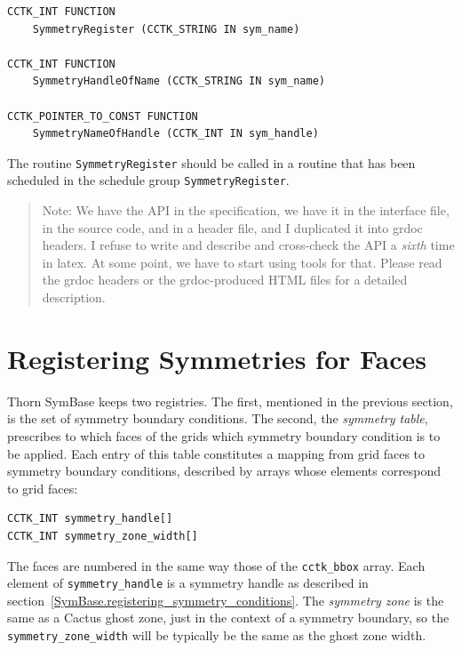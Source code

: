 \begin{verbatim}
CCTK_INT FUNCTION
    SymmetryRegister (CCTK_STRING IN sym_name)

CCTK_INT FUNCTION
    SymmetryHandleOfName (CCTK_STRING IN sym_name)

CCTK_POINTER_TO_CONST FUNCTION
    SymmetryNameOfHandle (CCTK_INT IN sym_handle)
\end{verbatim}

The routine \texttt{SymmetryRegister} should be called in a routine
that has been scheduled in the schedule group
\texttt{SymmetryRegister}.

\begin{quote}
Note: We have the API in the specification, we have it in the
interface file, in the source code, and in a header file, and I
duplicated it into grdoc headers.  I refuse to write and describe and
cross-check the API a \emph{sixth} time in latex.  At some point, we
have to start using tools for that.  Please read the grdoc headers or
the grdoc-produced HTML files for a detailed description.
\end{quote}



\section{Registering Symmetries for Faces}

Thorn SymBase keeps two registries.  The first, mentioned in the
previous section, is the set of symmetry boundary conditions. 
The second, the \emph{symmetry table}, prescribes to which faces
of the grids which symmetry boundary condition is to be applied.
Each entry of this table constitutes a mapping from grid faces to
symmetry boundary conditions, described by arrays whose elements
correspond to grid faces:

\begin{verbatim}
CCTK_INT symmetry_handle[]
CCTK_INT symmetry_zone_width[]
\end{verbatim}

The faces are numbered in the same way those of the \texttt{cctk\_bbox} array. 
Each element of \texttt{symmetry\_handle} is a symmetry handle as
described in section~\ref{SymBase.registering_symmetry_conditions}. 
The \emph{symmetry zone} is the same as a Cactus ghost zone, just in the
context of a symmetry boundary, so the \texttt{symmetry\_zone\_width} will
be typically be the same as the ghost zone width.


